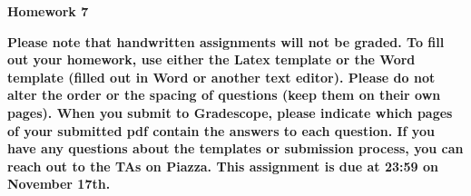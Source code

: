 \documentclass[12pt]{article}
\date{}
\begin{document}
	\begin{flushleft}
		\large \bf
		Homework 7 \\
	\end{flushleft}
{\bf
Please note that handwritten assignments will not be graded. To fill out your homework, use either the Latex template or the Word template (filled out in Word or another text editor). Please do not alter the order or the spacing of questions (keep them on their own pages). When you submit to Gradescope, please indicate which pages of your submitted pdf contain the answers to each question. If you have any questions about the templates or submission process, you can reach out to the TAs on Piazza. This assignment is due at 23:59 on November 17th.
}
\end{document}
